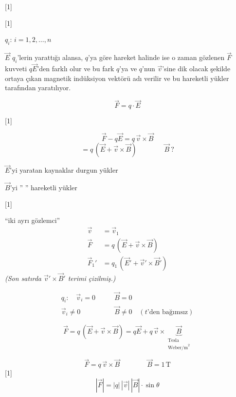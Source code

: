 \documentclass[11pt,a4paper]{article}
\begin{document}

[1]

[1]

\noindent $q_i$: \quad $i = 1,2,\dots,n$

$\vec{E}$ $q_i$'lerin yarattığı alansa,  $q$'ya göre hareket halinde ise o zaman gözlenen $\vec{F}$ kuvveti $q\vec{E}$'den farklı olur ve bu fark $q$'ya ve $q$'nun $\vec{v}$'sine dik olacak şekilde ortaya çıkan magnetik indüksiyon vektörü adı verilir ve bu hareketli yükler tarafından yaratılıyor.

\[ \vec{F} = q\cdot\vec{E} \]

[1]

\[ \vec{F} - q\vec{E} = q\,\vec{v}\times\vec{B} \]
\[ = q\,(\vec{E} + \vec{v}\times\vec{B}) \qquad\qquad \vec{B}\ ? \]

\noindent $\vec{E}$'yi yaratan kaynaklar durgun yükler

\noindent $\vec{B}$'yi \quad '' \qquad '' \qquad\qquad hareketli yükler

[1]

\noindent ``iki ayrı gözlemci''
\begin{align*}
  \vec{v} &= \vec{v}_1 \\
  \vec{F} &= q\,(\vec{E} + \vec{v}\times\vec{B}) \\
  \vec{F}_1' &= q_1\,(\vec{E}' + \vec{v}'\times\vec{B}')
\end{align*}
\textit{(Son satırda $\vec{v}'\times\vec{B}'$ terimi çizilmiş.)}

\[ \begin{aligned} q_i:\quad \vec{v}_i = 0 \qquad & \vec{B} = 0 \\ \vec{v}_i \neq 0 \qquad & \vec{B} \neq 0 \quad (t\text{'den bağımsız}) \end{aligned} \]

\[ \vec{F} = q\,(\vec{E} + \vec{v}\times\vec{B}) = q\vec{E} + q\,\vec{v}\times\underbrace{\vec{B}}_{\substack{\text{Tesla}\\ \text{Weber/m}^2}} \]

\[ \vec{F} = q\,\vec{v}\times\vec{B} \qquad\qquad \vec{B} = 1\,\mathrm{T} \]
[1]
\[ |\vec{F}| = |q|\,|\vec{v}|\,|\vec{B}|\cdot\sin\theta \]
\end{document}
